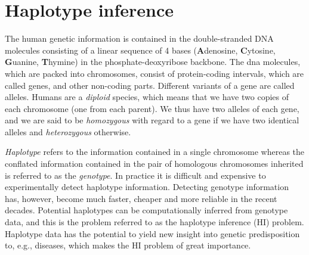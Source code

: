 \documentclass[12pt,a4paper]{article}
\begin{document}
\section{Haplotype inference}
\label{sec:hipp}
The human genetic information is contained in the double-stranded DNA molecules consisting of a linear sequence of 4 bases (\textbf{A}denosine, \textbf{C}ytosine, \textbf{G}uanine, \textbf{T}hymine) in the phosphate-deoxyribose backbone.
The dna molecules, which are packed into chromosomes, consist of protein-coding intervals, which are called genes, and other non-coding parts.
Different variants of a gene are called alleles.
Humans are a \emph{diploid} species, which means that we have two copies of each chromosome (one from each parent).
We thus have two alleles of each gene, and we are said to be \emph{homozygous} with regard to a gene if we have two identical alleles and \emph{heterozygous} otherwise.

\emph{Haplotype} refers to the information contained in a single chromosome whereas the conflated information contained in the pair of  homologous chromosomes inherited is referred to as the \emph{genotype}.
In practice it is difficult and expensive to experimentally detect haplotype information.
Detecting genotype information has, however, become much faster, cheaper and more reliable in the recent decades.
Potential haplotypes can be computationally inferred from genotype data, and this is the problem referred to as the haplotype inference (HI) problem.
Haplotype data has the potential to yield new insight into genetic predisposition to, e.g., diseases, which makes the HI problem of great importance.
\end{document}
